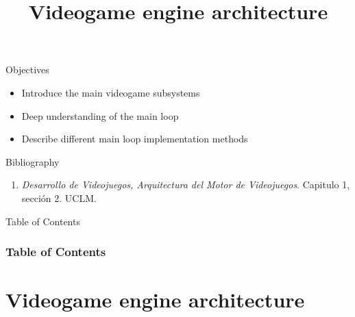 \documentclass[10pt,compress]{beamer} %
\title[Videogame engine architecture]{Videogame engine architecture}
\author{}
\institute{\asignatura}
\date{}
\begin{document}
{\titlepageBlue
    \begin{frame}
        \titlepage
    \end{frame}
}

\begin{frame}[plain]{}
   \begin{block}{Objectives}
   \begin{itemize}
        \item Introduce the main videogame subsystems
        \item Deep understanding of the main loop
        \item Describe different main loop implementation methods
	\end{itemize}
	\end{block}

   \begin{block}{Bibliography}
      \begin{enumerate}
          \item  \textit{Desarrollo de Videojuegos, Arquitectura del Motor de Videojuegos}. Capitulo 1, sección 2. UCLM.
      \end{enumerate} 
   \end{block}
\end{frame}

{
\eliminarNavegacion
\begin{frame}[shrink]{Table of Contents}
 \frametitle{Table of Contents}
 \tableofcontents
\end{frame}
}

\section{Videogame engine architecture}
\end{document}

